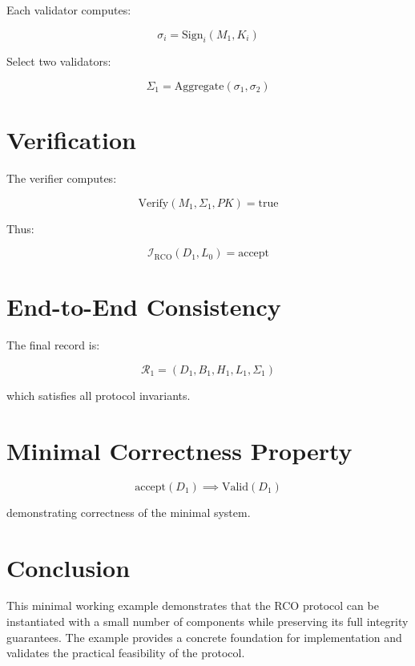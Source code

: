 Each validator computes:

\begin{equation}
\sigma_i = \text{Sign}_i(M_1, K_i)
\end{equation}

Select two validators:

\begin{equation}
\Sigma_1 = \text{Aggregate}(\sigma_1, \sigma_2)
\end{equation}

\section{Verification}

The verifier computes:

\begin{equation}
\text{Verify}(M_1, \Sigma_1, PK) = \text{true}
\end{equation}

Thus:

\begin{equation}
\mathcal{I}_{\text{RCO}}(D_1, L_0) = \text{accept}
\end{equation}

\section{End-to-End Consistency}

The final record is:

\begin{equation}
\mathcal{R}_1 = (D_1, B_1, H_1, L_1, \Sigma_1)
\end{equation}

which satisfies all protocol invariants.

\section{Minimal Correctness Property}

\begin{equation}
\text{accept}(D_1) \implies \text{Valid}(D_1)
\end{equation}

demonstrating correctness of the minimal system.

\section{Conclusion}

This minimal working example demonstrates that the RCO protocol can be instantiated with a small number of components while preserving its full integrity guarantees. The example provides a concrete foundation for implementation and validates the practical feasibility of the protocol.

